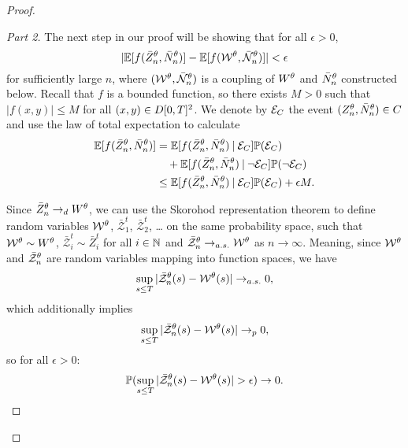 \begin{proof}
\begin{proof}[Part 2]\renewcommand{\qedsymbol}{}
The next step in our proof will be showing that for all $\epsilon > 0$,
\begin{equation}
|\mathbb{E}[ f(\bar{Z}^{\theta}_n, \bar{N}_n^{\theta})] - \mathbb{E}[f(\mathcal{W}^{\theta}, \bar{\mathcal{N}}_n^{\theta})]| < \epsilon
\end{equation}
for sufficiently large $n$,
where $(\mathcal{W}^{\theta}, \bar{\mathcal{N}}_n^{\theta})$ is a coupling of $W^{\theta}$ and $\bar{N}_n^{\theta}$ constructed below.
Recall that $f$ is a bounded function, so there exists $M>0$ such that $|f(x,y)| \leq M$ for all $(x,y) \in D[0, T]^2$.
We denote by $\mathcal{E}_{C}$ the event $(Z_n^{\theta}, \bar{N}_n^{\theta}) \in C$ and use the law of total expectation to calculate
\begin{equation} \label{E: Estimation step 1}
\begin{aligned}
\mathbb{E}[ f(\bar{Z}^{\theta}_n, \bar{N}_n^{\theta})] 
&= \mathbb{E}[f(\bar{Z}^{\theta}_n, \bar{N}_n^{\theta}) \: | \: \mathcal{E}_{C}] \mathbb{P}(\mathcal{E}_{C}) \\
&\quad + \mathbb{E}[f(\bar{Z}^{\theta}_n, \bar{N}_n^{\theta}) \: | \: \neg\mathcal{E}_{C}] \mathbb{P}(\neg\mathcal{E}_{C}) \\
&\leq \mathbb{E}[f(\bar{Z}^{\theta}_n, \bar{N}_n^{\theta}) \: | \: \mathcal{E}_{C}]\mathbb{P}(\mathcal{E}_{C}) + \epsilon M.
\end{aligned}
\end{equation}

Since $\bar{Z}^{\theta}_n \rightarrow_d W^{\theta}$, we can use the Skorohod representation theorem to define random variables 
$\mathcal{W}^{\theta}$, $\bar{\mathcal{Z}}^t_1$, $\bar{\mathcal{Z}}^t_2$, \dots
on the same probability space, such that $\mathcal{W}^{\theta} \sim W^{\theta}$, $\bar{\mathcal{Z}}^t_i \sim \bar{Z}^t_i$ for all $i \in \mathbb{N}$
and $\bar{\mathcal{Z}}^{\theta}_n \rightarrow_{a.s.} \mathcal{W}^{\theta}$ as $n \rightarrow \infty$.
Meaning, since $\mathcal{W}^{\theta}$ and $\bar{\mathcal{Z}}^{\theta}_n$ are random variables mapping into function spaces, we have
\begin{equation}
\sup_{s \leq T} |\bar{\mathcal{Z}}^{\theta}_n(s) - \mathcal{W}^{\theta}(s)| \rightarrow_{a.s.} 0,
\end{equation}
which additionally implies
\begin{equation} 
\sup_{s \leq T} |\bar{\mathcal{Z}}^{\theta}_n(s) - \mathcal{W}^{\theta}(s)| \rightarrow_p 0,
\end{equation}
so for all $\epsilon > 0$:
\begin{equation} \label{E: Prob(Event(delta)) 1}
\mathbb{P}( \sup_{s \leq T} |\bar{\mathcal{Z}}^{\theta}_n(s) - \mathcal{W}^{\theta}(s)| > \epsilon ) \rightarrow 0.
\end{equation}


\end{proof}
\end{proof}
